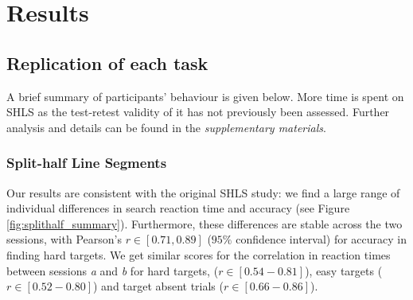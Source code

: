 \documentclass[twocolumn]{article}
\begin{document}
\section{Results}

\subsection{Replication of each task}

A brief summary of participants' behaviour is given below. More time is spent on SHLS as the test-retest validity of it has not previously been assessed. Further analysis and details can be found in the \textit{supplementary materials}.

\subsubsection{Split-half Line Segments}

Our results are consistent with the original SHLS study\cite{nowakowska2017}: we find a large range of individual differences in search reaction time and accuracy (see Figure \ref{fig:splithalf_summary}). Furthermore, these differences are stable across the two sessions, with Pearson's $r \in [0.71, 0.89]$ ($95\%$ confidence interval) for accuracy in finding hard targets. We get similar scores for the correlation in reaction times between sessions \textit{a} and \textit{b} for hard targets, ($r \in [0.54-0.81]$), easy targets ($r \in [0.52-0.80]$) and target absent trials ($r \in [0.66-0.86]$). 
\end{document}
